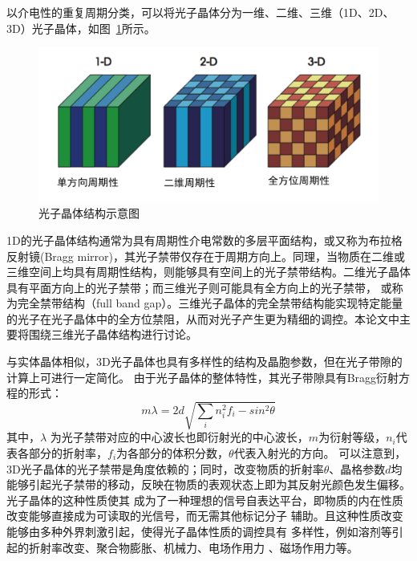 以介电性的重复周期分类，可以将光子晶体分为一维、二维、三维（1D、2D、3D）光子晶体，如图~\ref{fig:1d2d3d}所示。
\begin{figure}[htbp]
	\centering
	\includegraphics[width=0.85\linewidth]{figures/1d2d3d.png}
	\caption{光子晶体结构示意图}
	\label{fig:1d2d3d}
\end{figure}%
1D的光子晶体结构通常为具有周期性介电常数的多层平面结构，或又称为布拉格反射镜(Bragg mirror)，其光子禁带仅存在于周期方向上。同理，当物质在二维或三维空间上均具有周期性结构，则能够具有空间上的光子禁带结构。二维光子晶体具有平面方向上的光子禁带；而三维光子则可能具有全方向上的光子禁带，
或称为完全禁带结构（full band gap）。三维光子晶体的完全禁带结构能实现特定能量的光子在光子晶体中的全方位禁阻，从而对光子产生更为精细的调控。本论文中主要将围绕三维光子晶体结构进行讨论。

与实体晶体相似，3D光子晶体也具有多样性的结构及晶胞参数，但在光子带隙的计算上可进行一定简化。
由于光子晶体的整体特性，其光子带隙具有Bragg衍射方程的形式：
\begin{equation}
	\label{eqn:1-bragg}
	m\lambda=2d\sqrt{\sum_{i}n_i^2f_i-sin^2\theta}
\end{equation}
其中，$\lambda$ 为光子禁带对应的中心波长也即衍射光的中心波长，$m$为衍射等级，$n_i$代表各部分的折射率，$f_i$为各部分的体积分数，$\theta$代表入射光的方向。
可以注意到，3D光子晶体的光子禁带是角度依赖的；同时，改变物质的折射率$\theta$、晶格参数$d$均能够引起光子禁带的移动，反映在物质的表观状态上即为其反射光颜色发生偏移。光子晶体的这种性质使其
成为了一种理想的信号自表达平台，即物质的内在性质改变能够直接成为可读取的光信号，而无需其他标记分子
辅助。且这种性质改变能够由多种外界刺激引起，使得光子晶体性质的调控具有
多样性，例如溶剂等引起的折射率改变\cite{Higashiguchi2012SolventResponsive,Wang2011Size}、聚合物膨胀\cite{Fudouzi2003Colloidal}、机械力\cite{Haque2011Rapid,Wang2014Robust}、电场作用力\cite{Arsenault2007PhotonicCrystal,Han2014Structural} 、磁场作用力\cite{Ge2009Magnetochromatic,Caicedo2011Magnetophotonic}等。


